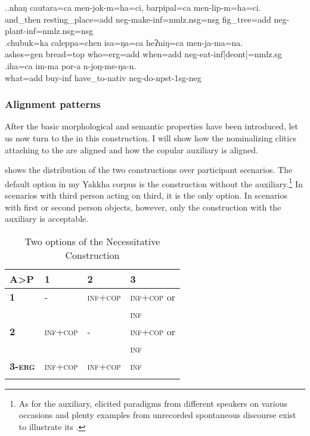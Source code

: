 \ex.\ag.nhaŋ     cautara=ca  men-jok-m=ha=ci,  barpipal=ca  men-lip-m=ha=ci.\\
and\_then resting\_place{\sc =add} {\sc neg-}make{\sc -inf=nmlz.nsg=nsg} fig\_tree{\sc =add} {\sc neg-}plant{\sc -inf=nmlz.nsg=nsg}\\
\bg.chubuk=ka    caleppa=chen   isa=ŋa=ca          heʔniŋ=ca        men-ja-ma=na.\\
ashes{\sc =gen} bread{\sc =top} who{\sc =erg=add} when{\sc =add} {\sc neg-}eat{\sc -inf[deont]=nmlz.sg}\\
 
\bg.iha=ca  im-ma     por-a           n-joŋ-me-ŋa-n.\\
what{\sc =add} buy{\sc -inf} have\_to{\sc -nativ} {\sc neg-}do{\sc -npst-1sg-neg}\\
  



\subsubsection{Alignment patterns}

After the basic morphological and semantic properties have been introduced, let us now turn to the  in this construction. I will show how the nominalizing clitics attaching to the  are aligned and how the copular auxiliary is aligned. 

 shows the distribution of the two constructions over participant scenarios. The default option in my Yakkha corpus  is the construction without the auxiliary.\footnote{As for the auxiliary, elicited paradigms from different speakers on various occasions and plenty examples from unrecorded spontaneous discourse exist to illustrate its .} In scenarios with third person acting on third, it is the only option. In scenarios with first or second person objects, however, only the construction with the auxiliary is acceptable.

\begin{table}[t]
\centering
\begin{tabular}{llll}
\lsptoprule
{\bf A>P}&{\bf 1}&{\bf 2}&{\bf 3}\\
\midrule
 {\bf 1}	&-&\textsc{inf}+\textsc{cop}&\textsc{inf}+\textsc{cop} or\\
 &&&\textsc{inf}\\
 \midrule
 {\bf 2}&\textsc{inf}+\textsc{cop}&-&\textsc{inf}+\textsc{cop} or\\
 &&&\textsc{inf}\\
 \midrule
 {\bf 3-\textsc{erg}}&\textsc{inf}+\textsc{cop}&\textsc{inf}+\textsc{cop}&\textsc{inf}\\
 \lspbottomrule
\end{tabular}
\caption{Two options of the Necessitative Construction}\label{cop-options}
\end{table}



